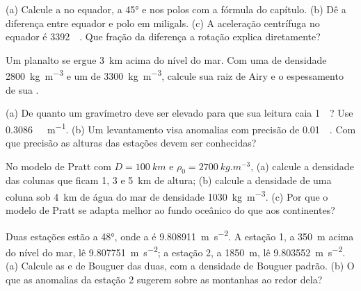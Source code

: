 \begin{exercise}[$\star$]\label{exo:b1:isostasy-gravity:2}
(a) Calcule a  no equador, a \ang{45} e nos polos com a fórmula do capítulo. (b) Dê a
diferença entre equador e polo em miligals. (c) A aceleração centrífuga no equador é
\qty{3392}{\milli\gal}. Que fração da diferença a rotação explica diretamente?
\end{exercise}

\begin{exercise}[$\star$]\label{exo:b1:isostasy-gravity:3}
Um planalto se ergue \qty{3}{km} acima do nível do mar. Com uma  de densidade
\qty{2800}{kg.m^{-3}} e um  de \qty{3300}{kg.m^{-3}}, calcule sua raiz de Airy e o
espessamento de sua .
\end{exercise}

\begin{exercise}[$\star$]\label{exo:b1:isostasy-gravity:4}
(a) De quanto um gravímetro deve ser elevado para que sua leitura caia
\qty{1}{\milli\gal}? Use \qty{0.3086}{\milli\gal.m^{-1}}. (b) Um levantamento visa
anomalias com precisão de \qty{0.01}{\milli\gal}. Com que precisão as alturas das
estações devem ser conhecidas?
\end{exercise}

\begin{exercise}[$\star\star$]\label{exo:b1:isostasy-gravity:5}
No modelo de Pratt com $D = \qty{100}{km}$ e $\rho_0 = \qty{2700}{kg.m^{-3}}$,
(a) calcule a densidade das colunas que ficam 1, 3 e \qty{5}{km} de altura;
(b) calcule a densidade de uma coluna sob \qty{4}{km} de água do mar de densidade
\qty{1030}{kg.m^{-3}}. (c) Por que o modelo de Pratt se adapta melhor ao fundo
oceânico do que aos continentes?
\end{exercise}

\begin{exercise}[$\star\star$]\label{exo:b1:isostasy-gravity:6}
Duas estações estão a  \ang{48}, onde a  é
\qty{9.808911}{m.s^{-2}}. A estação 1, a \qty{350}{m} acima do nível do mar, lê
\qty{9.807751}{m.s^{-2}}; a estação 2, a \qty{1850}{m}, lê
\qty{9.803552}{m.s^{-2}}. (a) Calcule as  e de Bouguer das duas,
com a densidade de Bouguer padrão. (b) O que as anomalias da estação 2 sugerem sobre as
montanhas ao redor dela?
\end{exercise}

